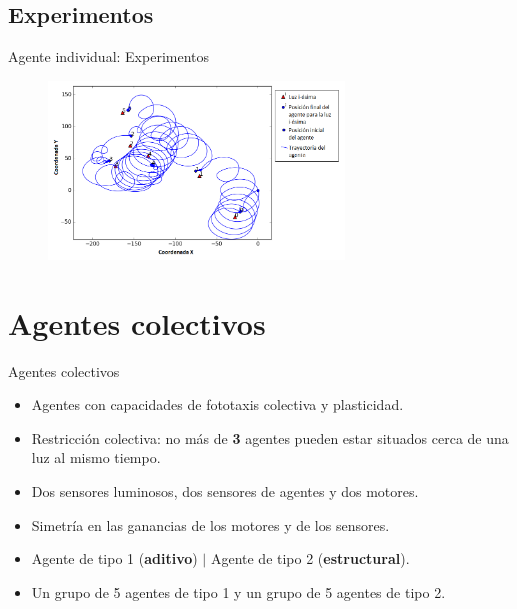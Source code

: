 \documentclass[aspectratio=169]{beamer}
\begin{document}
\subsection{Experimentos}
\begin{frame}{Agente individual: Experimentos}
  \begin{figure}
    \centering
  \includegraphics[width=0.7\textwidth,height=0.7\textheight]{Imagenes/Agente0Trayectoria}
\end{figure}
\end{frame}

\section{Agentes colectivos}
\begin{frame}{Agentes colectivos}
  \begin{itemize}
    \item Agentes con capacidades de fototaxis colectiva y plasticidad.
    \item Restricción colectiva: no más de \textbf{3} agentes pueden estar situados cerca de una luz al mismo tiempo.
    \item Dos sensores luminosos, dos sensores de agentes y dos motores.
    \item Simetría en las ganancias de los motores y de los sensores.
    \item Agente de tipo 1 (\textbf{aditivo}) $|$ Agente de tipo 2 (\textbf{estructural}).
    \item Un grupo de 5 agentes de tipo 1 y un grupo de 5 agentes de tipo 2.
  \end{itemize}
\end{frame}
\end{document}
